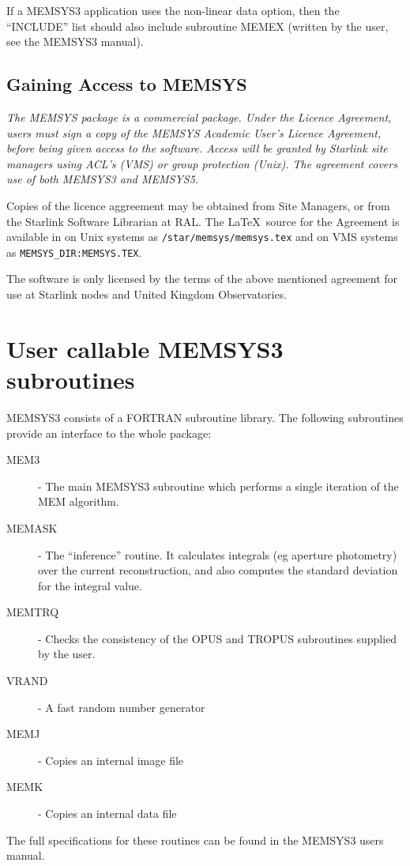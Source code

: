 If a MEMSYS3 application uses the non-linear data option, then the ``INCLUDE''
list  should also include subroutine MEMEX (written by the user, see the
MEMSYS3 manual).

\subsection{Gaining Access to MEMSYS}
{\em
The MEMSYS package is a commercial package. Under the Licence Agreement, users
must sign a copy of the {\rm MEMSYS Academic User's Licence Agreement}, before
being given access to the software. Access will be granted by Starlink site
managers using ACL's (VMS) or group protection (Unix). The agreement covers
use of both MEMSYS3 and MEMSYS5.

Copies of the licence aggreement may be obtained from Site Managers, or from
the Starlink Software Librarian at RAL. The \LaTeX\ source for the Agreement is
available in on Unix systems as {\tt /star/memsys/memsys.tex} and on VMS
systems as {\tt MEMSYS\_DIR:MEMSYS.TEX}.

The software is only licensed by the terms of the above mentioned agreement
for use at Starlink nodes and United Kingdom Observatories.
}

\appendix
\section {User callable MEMSYS3 subroutines}
MEMSYS3 consists of a FORTRAN subroutine library. The following
subroutines provide an interface to the whole package:
\begin {description}
\item [MEM3] - The main MEMSYS3 subroutine which performs a single
iteration of the MEM algorithm.
\item [MEMASK] - The ``inference'' routine. It calculates integrals (eg
aperture photometry) over the current reconstruction, and also computes
the standard deviation for the integral value.
\item [MEMTRQ] - Checks the consistency of the OPUS and TROPUS
subroutines supplied by the user.
\item [VRAND] - A fast random number generator
\item [MEMJ] - Copies an internal image file
\item [MEMK] - Copies an internal data file
\end {description}
The full specifications for these routines can be found in the MEMSYS3
users manual.

